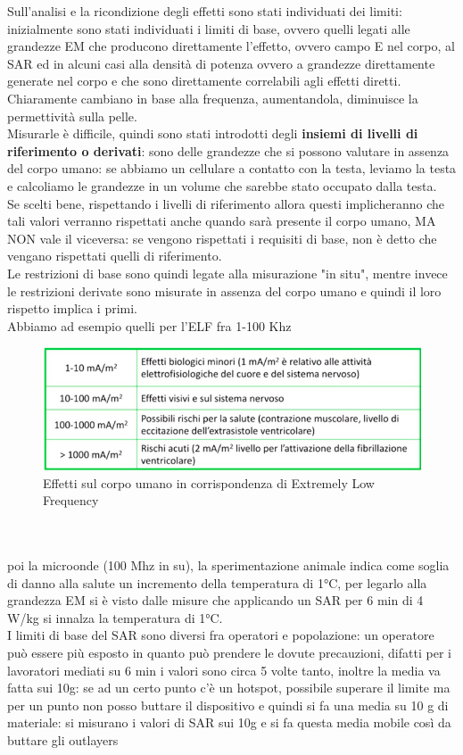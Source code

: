 \documentclass[oneside, 12pt]{extbook}
\begin{document}
Sull'analisi e la ricondizione degli effetti sono stati individuati dei limiti: inizialmente sono stati individuati i limiti di base, ovvero quelli legati alle grandezze EM che producono direttamente l'effetto, ovvero campo E nel corpo, al SAR ed in alcuni casi alla densità di potenza ovvero a grandezze direttamente generate nel corpo e che sono direttamente correlabili agli effetti diretti.\\Chiaramente cambiano in base alla frequenza, aumentandola, diminuisce la permettività sulla pelle.\\Misurarle è difficile, quindi sono stati introdotti degli \textbf{insiemi di livelli di riferimento o derivati}: sono delle grandezze che si possono valutare in assenza del corpo umano: se abbiamo un cellulare a contatto con la testa, leviamo la testa e calcoliamo le grandezze in un volume che sarebbe stato occupato dalla testa.\\Se scelti bene, rispettando i livelli di riferimento allora questi implicheranno che tali valori verranno rispettati anche quando sarà presente il corpo umano, MA NON vale il viceversa: se vengono rispettati i requisiti di base, non è detto che vengano rispettati quelli di riferimento.\\Le restrizioni di base sono quindi legate alla misurazione "in situ", mentre invece le restrizioni derivate sono misurate in assenza del corpo umano e quindi il loro rispetto implica i primi.\\Abbiamo ad esempio quelli per l'ELF fra 1-100 Khz
\begin{figure}[!h]
	\includegraphics[scale=0.5]{immagini/elf_effetti.png}
	\caption{Effetti sul corpo umano in corrispondenza di Extremely Low Frequency}
\end{figure}
\\\\poi la microonde (100 Mhz in su), la sperimentazione animale indica come soglia di danno alla salute un incremento della temperatura di 1°C, per legarlo alla grandezza EM si è visto dalle misure che applicando un SAR per 6 min di 4 W/kg si innalza la temperatura di 1°C.\\I limiti di base del SAR sono diversi fra operatori e popolazione: un operatore può essere più esposto in quanto può prendere le dovute precauzioni, difatti per i lavoratori mediati su 6 min i valori sono circa 5 volte tanto, inoltre la media va fatta sui 10g: se ad un certo punto c'è un hotspot,  possibile superare il limite ma per un punto non posso buttare il dispositivo e quindi si fa una media su 10 g di materiale: si misurano i valori di SAR sui 10g e si fa questa media mobile così da buttare gli outlayers
\end{document}
